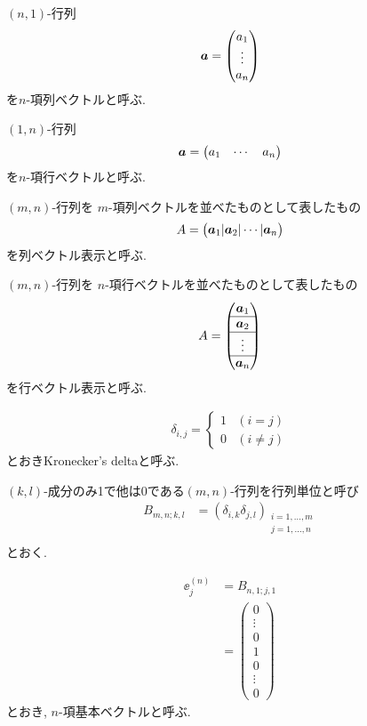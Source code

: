$(n,1)$-行列
\begin{align*}
  \boldsymbol{a}=
  \begin{pmatrix}a_1
  \\\vdots\\a_n
  \end{pmatrix}
\end{align*}
を$n$-項列ベクトルと呼ぶ.

$(1,n)$-行列
\begin{align*}
  \boldsymbol{a}=
  \begin{pmatrix}a_1
  &\cdots&a_n
  \end{pmatrix}
\end{align*}
を$n$-項行ベクトルと呼ぶ.

$(m,n)$-行列を
$m$-項列ベクトルを並べたものとして表したもの
\begin{align*}
  A=\begin{pmatrix}\boldsymbol{a}_1|\boldsymbol{a}_2|\cdots|\boldsymbol{a}_n\end{pmatrix}
\end{align*}
を列ベクトル表示と呼ぶ.


$(m,n)$-行列を
$n$-項行ベクトルを並べたものとして表したもの
\begin{align*}
  A=\begin{pmatrix}\boldsymbol{a}_1\\\hline \boldsymbol{a}_2\\\hline\vdots\\\hline\boldsymbol{a}_n\end{pmatrix}
\end{align*}
を行ベクトル表示と呼ぶ.

\begin{align*}
  \delta_{i,j}=
  \begin{cases}
    1&(i=j)\\
    0&(i\neq j)
  \end{cases}
\end{align*}
とおきKronecker's deltaと呼ぶ.

$(k,l)$-成分のみ1で他は0である$(m,n)$-行列を行列単位と呼び
\begin{align*}
  B_{m,n;k,l}
  &=(\delta_{i,k}\delta_{j,l})_{\substack{i=1,\ldots,m\\j=1,\ldots,n}}\\
\end{align*}
とおく.

\begin{align*}
  \ee^{(n)}_j
  &=B_{n,1;j,1}\\
  &=\begin{pmatrix}
  0\\\vdots\\0\\1\\0\\\vdots\\0
  \end{pmatrix}
\end{align*}
とおき, $n$-項基本ベクトルと呼ぶ.

